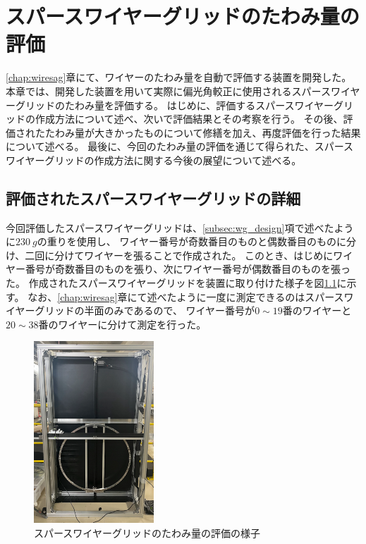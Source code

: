 \documentclass[../../main.tex]{subfiles}
\begin{document}
\chapter{スパースワイヤーグリッドのたわみ量の評価}
\label{chap:wiresag_swg}
\ref{chap:wiresag}章にて、ワイヤーのたわみ量を自動で評価する装置を開発した。
本章では、開発した装置を用いて実際に偏光角較正に使用されるスパースワイヤーグリッドのたわみ量を評価する。
はじめに、評価するスパースワイヤーグリッドの作成方法について述べ、次いで評価結果とその考察を行う。
その後、評価されたたわみ量が大きかったものについて修繕を加え、再度評価を行った結果について述べる。
最後に、今回のたわみ量の評価を通じて得られた、スパースワイヤーグリッドの作成方法に関する今後の展望について述べる。

\section{評価されたスパースワイヤーグリッドの詳細}
今回評価したスパースワイヤーグリッドは、\ref{subsec:wg_design}項で述べたように$\SI{230}{g}$の重りを使用し、
ワイヤー番号が奇数番目のものと偶数番目のものに分け、二回に分けてワイヤーを張ることで作成された。
このとき、はじめにワイヤー番号が奇数番目のものを張り、次にワイヤー番号が偶数番目のものを張った。
作成されたスパースワイヤーグリッドを装置に取り付けた様子を図\ref{fig:wiresag_swg_sparse_wiregrid}に示す。
なお、\ref{chap:wiresag}章にて述べたように一度に測定できるのはスパースワイヤーグリッドの半面のみであるので、
ワイヤー番号が$0\sim19$番のワイヤーと$20\sim38$番のワイヤーに分けて測定を行った。
\begin{figure}[H]
    \centering
    \includegraphics[width=0.4\textwidth]{wiresag_swg/wiresag_sparse_wiregrid.pdf}
    \caption{スパースワイヤーグリッドのたわみ量の評価の様子}
    \label{fig:wiresag_swg_sparse_wiregrid}
\end{figure}
\end{document}
